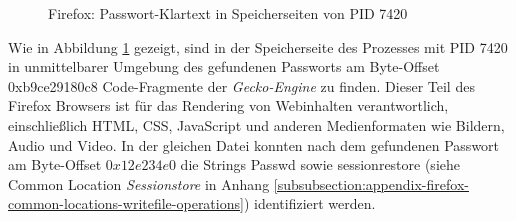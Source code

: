 \begin{figure}[h!]
	\centering
	\hfill
	\caption{Firefox: Passwort-Klartext in Speicherseiten von PID 7420}
	\label{img:firefox-pw-offset-pid-7420}  
\end{figure}
Wie in Abbildung \ref{img:firefox-pw-offset-pid-7420} gezeigt, sind in der Speicherseite des Prozesses mit PID 7420 in unmittelbarer Umgebung des gefundenen Passworts am Byte-Offset 0xb9ce29180c8 Code-Fragmente der \textit{Gecko-Engine} zu finden. Dieser Teil des Firefox Browsers ist für das Rendering von Webinhalten verantwortlich, einschließlich HTML, CSS, JavaScript und anderen Medienformaten wie Bildern, Audio und Video. \cite{MozillaWiki.05.06.2023}
In der gleichen Datei konnten nach dem gefundenen Passwort am Byte-Offset $0x12e234e0$ die Strings \glqq{}Passwd\grqq{} sowie \glqq{}sessionrestore\grqq{} (siehe Common Location \textit{Sessionstore} in Anhang \ref{subsubsection:appendix-firefox-common-locations-writefile-operations}) identifiziert werden. 

